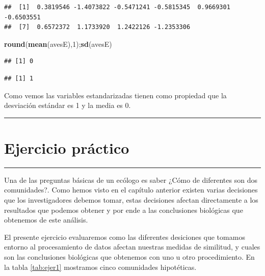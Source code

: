 \documentclass[]{book}
\newenvironment{Shaded}{\begin{snugshade}}{\end{snugshade}}
\newcommand{\KeywordTok}[1]{\textcolor[rgb]{0.13,0.29,0.53}{\textbf{{#1}}}}
\newcommand{\DecValTok}[1]{\textcolor[rgb]{0.00,0.00,0.81}{{#1}}}
\newcommand{\NormalTok}[1]{{#1}}
\begin{document}
\begin{verbatim}
##  [1]  0.3819546 -1.4073822 -0.5471241 -0.5815345  0.9669301 -0.6503551
##  [7]  0.6572372  1.1733920  1.2422126 -1.2353306
\end{verbatim}

\begin{Shaded}
\begin{Highlighting}[]
\KeywordTok{round}\NormalTok{(}\KeywordTok{mean}\NormalTok{(avesE),}\DecValTok{1}\NormalTok{);}\KeywordTok{sd}\NormalTok{(avesE) }
\end{Highlighting}
\end{Shaded}

\begin{verbatim}
## [1] 0
\end{verbatim}

\begin{verbatim}
## [1] 1
\end{verbatim}

Como vemos las variables estandarizadas tienen como propiedad que la
desviación estándar es 1 y la media es 0.

\begin{center}\rule{0.5\linewidth}{\linethickness}\end{center}

\chapter{Ejercicio práctico}\label{ejercicio-practico}

\begin{center}\rule{0.5\linewidth}{\linethickness}\end{center}

Una de las preguntas básicas de un ecólogo es saber ¿Cómo de diferentes
son dos comunidades?. Como hemos visto en el capítulo anterior existen
varias decisiones que los investigadores debemos tomar, estas decisiones
afectan directamente a los resultados que podemos obtener y por ende a
las conclusiones biológicas que obtenemos de este análisis.

El presente ejercicio evaluaremos como las diferentes desiciones que
tomamos entorno al procesamiento de datos afectan nuestras medidas de
similitud, y cuales son las conclusiones biológicas que obtenemos con
uno u otro procedimiento. En la tabla \ref{tab:ejer1} mostramos cinco
comunidades hipotéticas.
\end{document}
